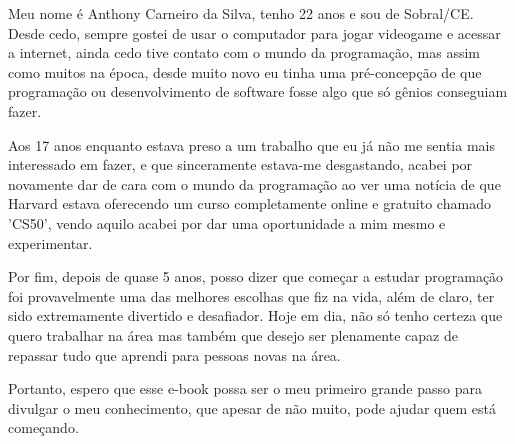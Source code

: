Meu nome é Anthony Carneiro da Silva, tenho 22 anos e sou de 
Sobral/CE. Desde cedo, sempre gostei de usar o computador para jogar 
videogame e acessar a internet, ainda cedo tive contato com o mundo 
da programação, mas assim como muitos na época, desde muito novo eu tinha 
uma pré-concepção de que programação ou desenvolvimento de software fosse 
algo que só gênios conseguiam fazer.

Aos 17 anos enquanto estava preso a um trabalho que eu já não me sentia 
mais interessado em fazer, e que sinceramente estava-me desgastando, acabei 
por novamente dar de cara com o mundo da programação ao ver uma notícia de 
que Harvard estava oferecendo um curso completamente online e gratuito 
chamado 'CS50', vendo aquilo acabei por dar uma oportunidade a mim mesmo e 
experimentar.

Por fim, depois de quase 5 anos, posso dizer que começar a 
estudar programação foi provavelmente uma das melhores escolhas que fiz 
na vida, além de claro, ter sido extremamente divertido e desafiador. 
Hoje em dia, não só tenho certeza que quero trabalhar na área mas 
também que desejo ser plenamente capaz de repassar tudo que aprendi para
pessoas novas na área.

Portanto, espero que esse e-book possa ser o meu primeiro grande passo para 
divulgar o meu conhecimento, que apesar de não muito, pode ajudar quem está 
começando.
